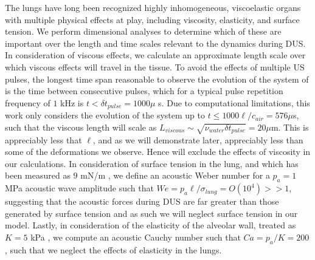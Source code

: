 \documentclass{jfm}%
\newcommand{\orderof}[1]{\ensuremath{\textit{O}\left(#1\right)}}
\begin{document}
The lungs have long been recognized highly inhomogeneous, viscoelastic
organs \citep{Bayliss1939,Suki1994} with multiple physical effects at
play, including viscosity, elasticity, and surface tension. We perform
dimensional analyses to determine which of these are important over
the length and time scales relevant to the dynamics during
\ac{DUS}. In consideration of viscous effects, we calculate an
approximate length scale over which viscous effects will travel in the
tissue. To avoid the effects of multiple \ac{US} pulses, the longest
time span reasonable to observe the evolution of the system of is the
time between consecutive pulses, which for a typical pulse repetition
frequency of $1$ kHz is $t<\delta t_{pulse}=1000 \mu$ s. Due to
computational limitations, this work only considers the evolution of
the system up to $t\leq1000 \ell/c_{air}=576 \mu$s, such that the
viscous length will scale as
$L_{viscous}\sim\sqrt{\nu_{water} \delta t_{pulse}}=20 \mu$m. This is
appreciably less that $\ell$, and as we will demonstrate later,
appreciably less than some of the deformations we observe. Hence will
exclude the effects of viscosity in our calculations. In consideration
of surface tension in the lung, and which has been measured as $9$ mN/m
\citep{Schurch1976}, we define an acoustic Weber number for a
$p_a=1$ MPa acoustic wave amplitude such that
$We=p_a\ell/\sigma_{lung}=\orderof{10^4}>>1$, suggesting that the
acoustic forces during \ac{DUS} are far greater than those generated
by surface tension and as such we will neglect surface tension in our
model. Lastly, in consideration of the elasticity of the alveolar
wall, treated as $K = 5$ kPa \cite{Cavalcante2005}, we compute an
acoustic Cauchy number such that $Ca=p_a/K=200$, such that we neglect
the effects of elasticity in the lungs.
%
%
\end{document}
